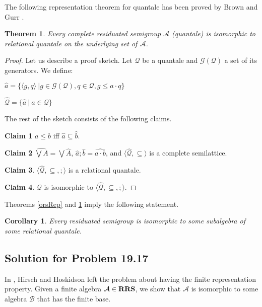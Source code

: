 \documentclass[a4paper]{article}
\theoremstyle{defin}
\theoremstyle{theorem}
\newtheorem{theorem}{Theorem}
\theoremstyle{prop}
\theoremstyle{lemma}
\theoremstyle{ex}
\theoremstyle{col}
\newtheorem{col}{Corollary}
\theoremstyle{claim}
\begin{document}
The following representation theorem for quantale has been proved by Brown and Gurr \cite{brown1993representation}.
\begin{theorem} \label{quantaleRep}
  Every complete residuated semigroup $\mathcal{A}$ (quantale) is isomorphic to relational quantale on the underlying set of $\mathcal{A}$.
\end{theorem}

\begin{proof}
  Let us describe a proof sketch. Let $\mathcal{Q}$ be a quantale and $\mathcal{G}(\mathcal{Q})$ a set of its generators. We define:

  \begin{center}
    $\hat{a} = \{ \langle g, q \rangle \: | g \in \mathcal{G}(\mathcal{Q}), q \in \mathcal{Q}, g \leq a \cdot q \}$

    $\widehat{\mathcal{Q}} = \{ \hat{a} \: | \: a \in \mathcal{Q} \}$
  \end{center}

  The rest of the sketch consists of the following claims.

  {\bf Claim 1} $a \leq b$ iff $\hat{a} \subseteq \hat{b}$.

  {\bf Claim 2} $\widehat{\bigvee A} = \bigvee \widehat{A}$, $\hat{a} ; \hat{b} = \widehat{a \cdot b}$, and $\langle \widehat{\mathcal{Q}}, \subseteq \rangle$ is a complete semilattice.

  {\bf Claim 3}. $\langle \widehat{\mathcal{Q}}, \subseteq, ; \rangle$ is a relational quantale.

  {\bf Claim 4}. $\mathcal{Q}$ is isomorphic to $\langle \widehat{\mathcal{Q}}, \subseteq, ; \rangle$.
\end{proof}

Theorems \ref{orsRep} and \ref{quantaleRep} imply the following statement.
\begin{col} \label{orsRep2}
  Every residuated semigroup is isomorphic to some subalgebra of some relational quantale.
\end{col}

\subsection{Solution for Problem 19.17 \cite{hirsch2002relation}}

In \cite{hirsch2002relation}, Hirsch and Hoskidson left the problem about having the finite representation property. Given a finite algebra $\mathcal{A} \in {\bf RRS}$, we show that $\mathcal{A}$ is isomorphic to some algebra $\mathcal{B}$ that has the finite base.
\end{document}
